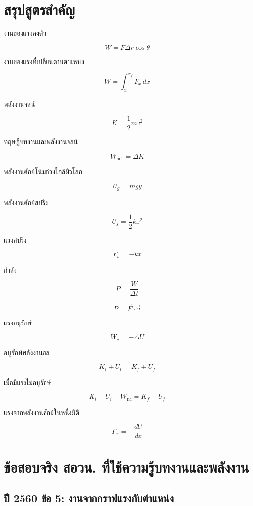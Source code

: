 \section{สรุปสูตรสำคัญ}

\begin{tcolorbox}[title=สรุปบท: งานและพลังงาน]
งานของแรงคงตัว

\[
W=F\Delta r\cos\theta
\]

งานของแรงที่เปลี่ยนตามตำแหน่ง

\[
W=\int_{x_i}^{x_f}F_x\,dx
\]

พลังงานจลน์

\[
K=\frac{1}{2}mv^2
\]

ทฤษฎีบทงานและพลังงานจลน์

\[
W_{\text{net}}=\Delta K
\]

พลังงานศักย์โน้มถ่วงใกล้ผิวโลก

\[
U_g=mgy
\]

พลังงานศักย์สปริง

\[
U_s=\frac{1}{2}kx^2
\]
\end{tcolorbox}

\begin{tcolorbox}[title=สรุปบท: งานและพลังงาน ต่อ]
แรงสปริง

\[
F_s=-kx
\]

กำลัง

\[
P=\frac{W}{\Delta t}
\]

\[
P=\vec{F}\cdot\vec{v}
\]

แรงอนุรักษ์

\[
W_c=-\Delta U
\]

อนุรักษ์พลังงานกล

\[
K_i+U_i=K_f+U_f
\]

เมื่อมีแรงไม่อนุรักษ์

\[
K_i+U_i+W_{\text{nc}}=K_f+U_f
\]

แรงจากพลังงานศักย์ในหนึ่งมิติ

\[
F_x=-\frac{dU}{dx}
\]
\end{tcolorbox}

\section{ข้อสอบจริง สอวน. ที่ใช้ความรู้บทงานและพลังงาน}


\subsection{ปี 2560 ข้อ 5: งานจากกราฟแรงกับตำแหน่ง}

